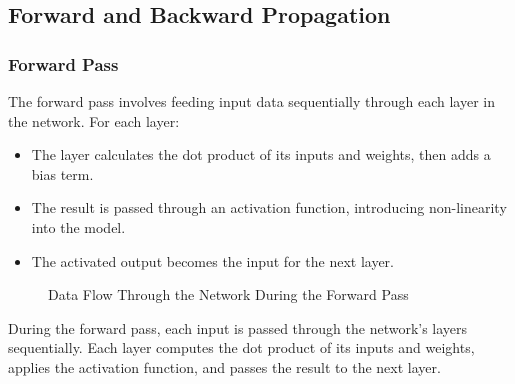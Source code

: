 \documentclass{article}
\begin{document}
\subsection{Forward and Backward Propagation}

\subsubsection{Forward Pass}
The forward pass involves feeding input data sequentially through each layer in the network. For each layer:
\begin{itemize}
    \item The layer calculates the dot product of its inputs and weights, then adds a bias term.
    \item The result is passed through an activation function, introducing non-linearity into the model.
    \item The activated output becomes the input for the next layer.
\end{itemize}
\begin{figure}[h!]
    \centering
    \caption{Data Flow Through the Network During the Forward Pass}
\end{figure}
During the forward pass, each input is passed through the network’s layers sequentially. Each layer computes the dot product of its inputs and weights, applies the activation function, and passes the result to the next layer.
\end{document}
